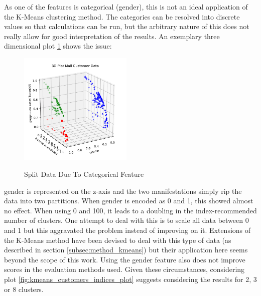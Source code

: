 As one of the features is categorical (gender), this is not an ideal application of the K-Means clustering method. The categories can be resolved into discrete values so that calculations can be run, but the arbitrary nature of this does not really allow for good interpretation of the results. An exemplary three dimensional plot \ref{fig:kmeans_customers_3d} shows the issue: 
\begin{figure}
  \centering
    \includegraphics[width=0.48\textwidth, clip]{images/kmeans_customers_3d.pdf}
  \label{fig:kmeans_customers_3d}
  \caption{Split Data Due To Categorical Feature}
\end{figure}
gender is represented on the z-axis and the two manifestations simply rip the data into two partitions. When gender is encoded as 0 and 1, this showed almost no effect. When using 0 and 100, it leads to a doubling in the index-recommended number of clusters. One attempt to deal with this is to scale all data between 0 and 1 but this aggravated the problem instead of improving on it. Extensions of the K-Means method have been devised to deal with this type of data (as described in section \ref{subsec:method_kmeans}) but their application here seems beyond the scope of this work. Using the gender feature also does not improve scores in the evaluation methods used. Given these circumstances, considering plot \ref{fig:kmeans_customers_indices_plot} suggests considering the results for 2, 3 or 8 clusters.

